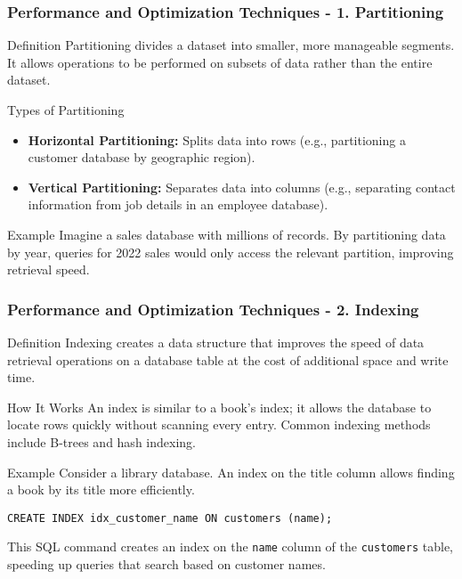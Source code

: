 \documentclass{beamer}
\begin{document}
\begin{frame}[fragile]
    \frametitle{Performance and Optimization Techniques - 1. Partitioning}
    \begin{block}{Definition}
        Partitioning divides a dataset into smaller, more manageable segments. It allows operations to be performed on subsets of data rather than the entire dataset.
    \end{block}
    
    \begin{block}{Types of Partitioning}
        \begin{itemize}
            \item \textbf{Horizontal Partitioning:} Splits data into rows (e.g., partitioning a customer database by geographic region).
            \item \textbf{Vertical Partitioning:} Separates data into columns (e.g., separating contact information from job details in an employee database).
        \end{itemize}
    \end{block}
    
    \begin{block}{Example}
        Imagine a sales database with millions of records. By partitioning data by year, queries for 2022 sales would only access the relevant partition, improving retrieval speed.
    \end{block}
\end{frame}

\begin{frame}[fragile]
    \frametitle{Performance and Optimization Techniques - 2. Indexing}
    \begin{block}{Definition}
        Indexing creates a data structure that improves the speed of data retrieval operations on a database table at the cost of additional space and write time.
    \end{block}
    
    \begin{block}{How It Works}
        An index is similar to a book's index; it allows the database to locate rows quickly without scanning every entry. Common indexing methods include B-trees and hash indexing.
    \end{block}
    
    \begin{block}{Example}
        Consider a library database. An index on the title column allows finding a book by its title more efficiently.
    \end{block}
    
    \begin{lstlisting}
CREATE INDEX idx_customer_name ON customers (name);
    \end{lstlisting}
    
    This SQL command creates an index on the \texttt{name} column of the \texttt{customers} table, speeding up queries that search based on customer names.
\end{frame}
\end{document}
